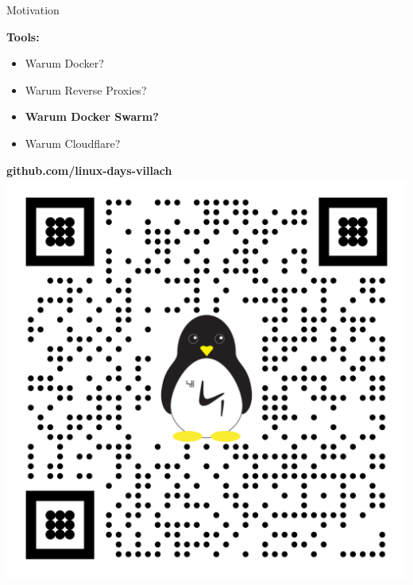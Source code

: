 \documentclass[10pt, unknownkeysallowed]{beamer}
\begin{document}
\begin{frame}{Motivation}
\begin{minipage}{.45\textwidth}
    \vspace*{5px}
    \textbf{Tools:}
	\begin{itemize}
	    \item Warum Docker?
		\item Warum Reverse Proxies?
		\item \textbf{Warum Docker Swarm?}
		\item Warum Cloudflare?
	\end{itemize}
	\vspace*{10px}
\end{minipage}
\hfill\vline\hfill
\begin{minipage}{.45\textwidth}
    \vspace*{15px}
    \textbf{github.com/linux-days-villach}
    \includegraphics[width=\linewidth,center]{qr-code.png}
\end{minipage}
\end{frame}
\end{document}
